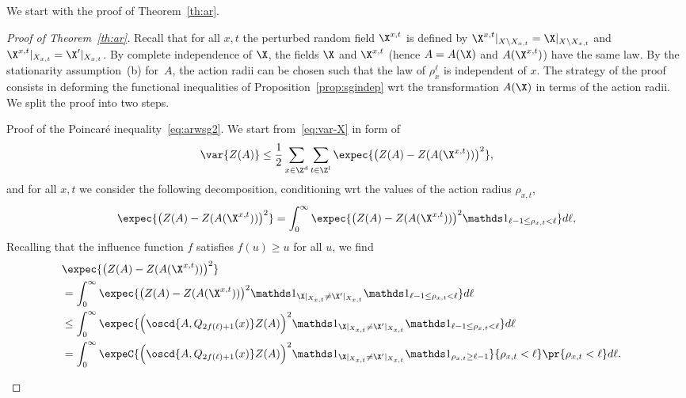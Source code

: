 We start with the proof of Theorem~\ref{th:ar}.
\begin{proof}[Proof of Theorem~\ref{th:ar}]
Recall that for all $x,t$ the perturbed random field $\X^{x,t}$ is defined by $\X^{x,t}|_{X\setminus X_{x,t}}=\X|_{X\setminus X_{x,t}}$ and $\X^{x,t}|_{X_{x,t}}=\X'|_{X_{x,t}}$. By complete independence of $\X$, the fields $\X$ and $\X^{x,t}$ (hence $A=A(\X)$ and $A(\X^{x,t})$) have the same law. By the stationarity assumption~(b) for~$A$, the action radii can be chosen such that the law of $\rho_x^\ell$ is independent of $x$. The strategy of the proof consists in deforming the functional inequalities of Proposition~\ref{prop:sgindep} wrt the transformation $A(\X)$ in terms of the action radii. We split the proof into two steps.



\begin{step}{Proof of the Poincaré inequality~\eqref{eq:arwsg2}.}\label{step1prooftheo2.6}
We start from~\eqref{eq:var-X} in form of
\begin{equation}\label{eq:var-X-re0}
\var{Z(A)}\le\frac12\sum_{x\in\Z^d}\sum_{t\in\Z^l}\expec{\big(Z(A)-Z(A(\X^{x,t}))\big)^2},
\end{equation}
and for all $x,t$ we consider the following decomposition, conditioning wrt the values of the action radius $\rho_{x,t}$,
\begin{equation*}
\expec{\big(Z(A)-Z(A(\X^{x,t}))\big)^2}=\int_0^\infty \expec{\big(Z(A)-Z(A(\X^{x,t}))\big)^2\mathds1_{\ell-1\le \rho_{x,t}< \ell}}d\ell,
\end{equation*}
Recalling that the influence function $f$ satisfies $f(u)\ge u$ for all $u$, we find
\begin{align*}
\lefteqn{\expec{\big(Z(A)-Z(A(\X^{x,t}))\big)^2}}\\
&=\int_0^\infty \expec{\big(Z(A)-Z(A(\X^{x,t}))\big)^2\mathds1_{\X|_{X_{x,t}}\ne \X'|_{X_{x,t}}}\mathds1_{\ell-1\le \rho_{x,t}< \ell}}d\ell\\
&\le\int_0^\infty \expec{\Big(\oscd{A,Q_{2f(\ell)+1}(x)}Z(A)\Big)^2\mathds1_{\X|_{X_{x,t}}\ne \X'|_{X_{x,t}}}\mathds1_{\ell-1\le \rho_{x,t}< \ell}}d\ell\\
&=\int_0^\infty \expeC{\Big(\oscd{A,Q_{2f(\ell)+1}(x)}Z(A)\Big)^2\mathds1_{\X|_{X_{x,t}}\ne \X'|_{X_{x,t}}}\mathds1_{\rho_{x,t}\ge\ell-1}}{\rho_{x,t}<\ell}\pr{\rho_{x,t}< \ell}d\ell.
\end{align*}
\pagebreak


\end{step}
\end{proof}
